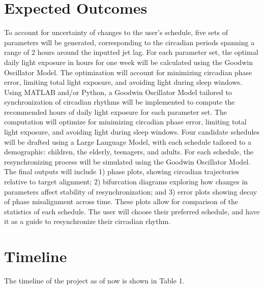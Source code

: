 \documentclass{article}
\begin{document}
\section{Expected Outcomes}
\indent To account for uncertainty of changes to the user’s schedule, five sets of parameters will be generated, corresponding to the circadian periods spanning a range of 2 hours around the inputted jet lag. For each parameter set, the optimal daily light exposure in hours for one week will be calculated using the Goodwin Oscillator Model. The optimization will account for minimizing circadian phase error, limiting total light exposure, and avoiding light during sleep windows. 
Using MATLAB and/or Python, a Goodwin Oscillator Model tailored to synchronization of circadian rhythms will be implemented to compute the recommended hours of daily light exposure for each parameter set. The computation will optimize for minimizing circadian phase error, limiting total light exposure, and avoiding light during sleep windows. Four candidate schedules will be drafted using a Large Language Model, with each schedule tailored to a demographic: children, the elderly, teenagers, and adults. For each schedule, the resynchronizing process will be simulated using the Goodwin Oscillator Model. The final outputs will include 1) phase plots, showing circadian trajectories relative to target alignment; 2) bifurcation diagrams exploring how changes in parameters affect stability of resynchronization; and 3) error plots showing decay of phase misalignment across time. These plots allow for comparison of the statistics of each schedule. The user will choose their preferred schedule, and have it as a guide to resynchronize their circadian rhythm.

\section{Timeline}
\indent The timeline of the project as of now is shown in Table 1.
\end{document}

